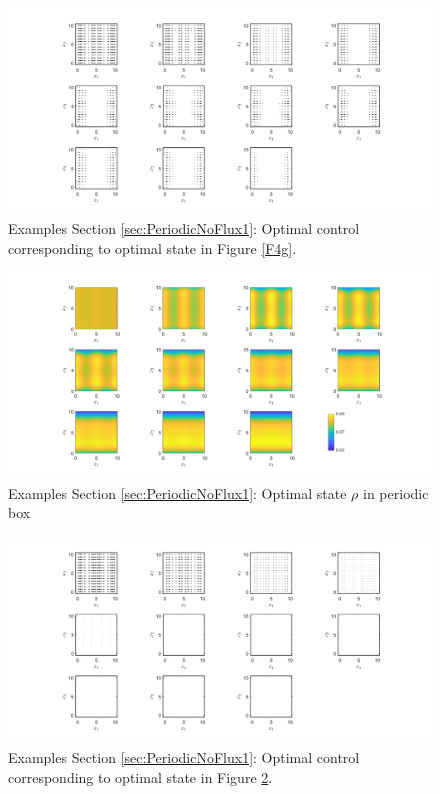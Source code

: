 \documentclass[11pt, a4paper]{article}
\theoremstyle{definition}
\begin{document}
\begin{figure}[h]
	\centering
	\includegraphics[scale=0.35]{ConOptPeri3.png}
	\caption{Examples Section \ref{sec:PeriodicNoFlux1}: Optimal control corresponding to optimal state in Figure \ref{F4g}.} 
	\label{F4h}
\end{figure}

\begin{figure}[h]
	\centering
	\includegraphics[scale=0.35]{rhoOptPeri3a.png}
	\caption{Examples Section \ref{sec:PeriodicNoFlux1}: Optimal state $\rho$ in periodic box} 
	\label{F4i}
\end{figure}

\begin{figure}[h]
	\centering
	\includegraphics[scale=0.35]{ConOptPeri3a.png}
	\caption{Examples Section \ref{sec:PeriodicNoFlux1}: Optimal control corresponding to optimal state in Figure \ref{F4i}.} 
	\label{F4j}
\end{figure}
\end{document}
